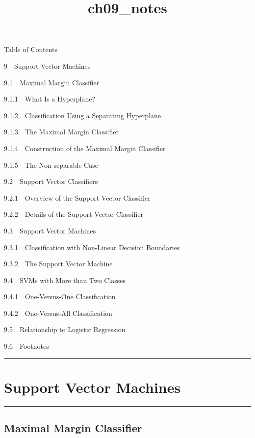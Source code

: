 \documentclass[11pt]{article}
\title{ch09\_notes}
\begin{document}
    
    
    \maketitle
    
    

    
    Table of Contents{}

{{9~~}Support Vector Machines}

{{9.1~~}Maximal Margin Classifier}

{{9.1.1~~}What Is a Hyperplane?}

{{9.1.2~~}Classification Using a Separating Hyperplane}

{{9.1.3~~}The Maximal Margin Classifier}

{{9.1.4~~}Construction of the Maximal Margin Classifier}

{{9.1.5~~}The Non-separable Case}

{{9.2~~}Support Vector Classifiers}

{{9.2.1~~}Overview of the Support Vector Classifier}

{{9.2.2~~}Details of the Support Vector Classifier}

{{9.3~~}Support Vector Machines}

{{9.3.1~~}Classification with Non-Linear Decision Boundaries}

{{9.3.2~~}The Support Vector Machine}

{{9.4~~}SVMs with More than Two Classes}

{{9.4.1~~}One-Versus-One Classification}

{{9.4.2~~}One-Versus-All Classification}

{{9.5~~}Relationship to Logistic Regression}

{{9.6~~}Footnotes}

    \begin{center}\rule{0.5\linewidth}{\linethickness}\end{center}

\hypertarget{support-vector-machines}{%
\section{Support Vector Machines}\label{support-vector-machines}}

\begin{center}\rule{0.5\linewidth}{\linethickness}\end{center}

    \hypertarget{maximal-margin-classifier}{%
\subsection{Maximal Margin Classifier}\label{maximal-margin-classifier}}
\end{document}
